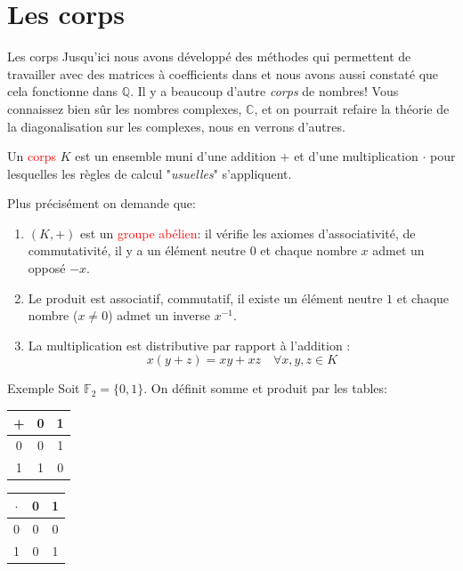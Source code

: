 \chapter{Les corps}
\begin{parag}{Les corps}
    Jusqu'ici nous avons développé des méthodes qui permettent de travailler avec des matrices à coefficients dans \R et nous avons aussi constaté que cela fonctionne dans $\mathbb{Q}$. Il y a beaucoup d'autre \textit{corps} de nombres! Vous connaissez bien sûr les nombres complexes, $\mathbb{C}$, et on pourrait refaire la théorie de la diagonalisation sur les complexes, nous en verrons d'autres.
    \begin{definition}
        Un \textcolor{red}{corps} $K$ est un ensemble muni d'une addition $+$ et d'une multiplication $\cdot$ pour lesquelles les règles de calcul "\textit{usuelles}" s'appliquent.
    \end{definition}

    Plus précisément on demande que:
    \begin{enumerate}
        \item $(K, +)$ est un \textcolor{red}{groupe abélien}: il vérifie les axiomes d'associativité, de commutativité, il y a un élément neutre $0$ et chaque nombre $x$ admet un opposé $-x$.
        \item Le produit est associatif, commutatif, il existe un élément neutre $1$ et chaque nombre ($x \neq 0$) admet un inverse $x^{-1}$.
        \item La multiplication est distributive par rapport à l'addition : 
        \[x(y + z) = xy + xz \quad \forall x, y, z \in K\]
    \end{enumerate}
    \begin{subparag}{Exemple}
        Soit $\mathbb{F}_2 = \{0, 1\}$. On définit somme et produit par les tables:
        \begin{center}
            
        
        \begin{tabular}{|c||c|c|}
        \hline
           +  & 0 & 1 \\
           \hline
           \hline
            0 & 0 & 1\\
            \hline
            1 & 1 & 0\\
            \hline
        \end{tabular}

        
        \begin{tabular}{|c||c|c|}
        \hline
           $\cdot$  & 0 & 1 \\
           \hline
           \hline
            0 & 0 & 0\\
            \hline
            1 & 0 & 1\\
            \hline
        \end{tabular}



\end{center}
\end{subparag}
\end{parag}
